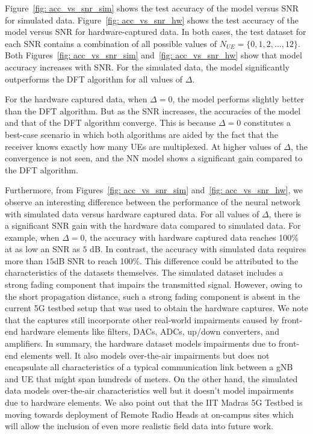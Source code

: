 \documentclass[journal]{IEEEtran}
\begin{document}
Figure~\ref{fig: acc_vs_snr_sim} shows the test accuracy of the model versus SNR for simulated data. Figure~\ref{fig: acc_vs_snr_hw} shows the test accuracy of the model versus SNR for hardware-captured data. In both cases, the test dataset for each SNR contains a combination of all possible values of $N_{UE} = \{0, 1, 2, \dots, 12\}$. Both Figures~\ref{fig: acc_vs_snr_sim} and~\ref{fig: acc_vs_snr_hw} show that model accuracy increases with SNR. For the simulated data, the model significantly outperforms the DFT algorithm for all values of $\Delta$.

For the hardware captured data, when $\Delta = 0$, the model performs slightly better than the DFT algorithm. But as the SNR increases, the accuracies of the model and that of the DFT algorithm converge. This is because $\Delta = 0$ constitutes a best-case scenario in which both algorithms are aided by the fact that the receiver knows exactly how many UEs are multiplexed. At higher values of $\Delta$, the convergence is not seen, and the NN model shows a significant gain compared to the DFT algorithm. 

Furthermore, from Figures~\ref{fig: acc_vs_snr_sim} and~\ref{fig: acc_vs_snr_hw}, we observe an interesting difference between the performance of the neural network with simulated data versus hardware captured data. For all values of $\Delta$, there is a significant SNR gain with the hardware data compared to simulated data. For example, when $\Delta = 0$, the accuracy with hardware captured data reaches 100\% at as low an SNR as $5$ dB. In contrast, the accuracy with simulated data requires more than $15$dB SNR to reach 100\%. This difference could be attributed to the characteristics of the datasets themselves. The simulated dataset includes a strong fading component that impairs the transmitted signal. However, owing to the short propagation distance, such a strong fading component is absent in the current 5G testbed setup that was used to obtain the hardware captures. We note that the captures still incorporate other real-world impairments caused by front-end hardware elements like filters, DACs, ADCs, up/down converters, and amplifiers. In summary, the hardware dataset models impairments due to front-end elements well. It also models over-the-air impairments but does not encapsulate all characteristics of a typical communication link between a gNB and UE that might span hundreds of meters. On the other hand, the simulated data models over-the-air characteristics well but it doesn't model impairments due to hardware elements. We also point out that the IIT Madras 5G Testbed is moving towards deployment of Remote Radio Heads at on-campus sites which will allow the inclusion of even more realistic field data into future work.
\end{document}
